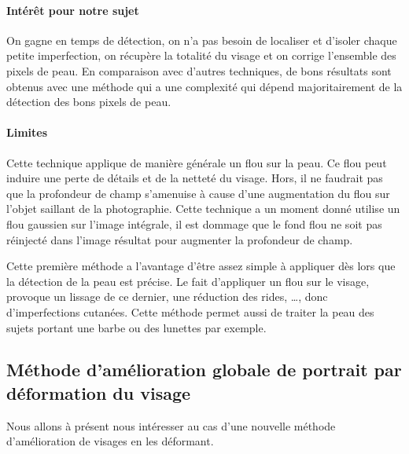 \documentclass[11pt, french,screen]{report-rd-info}
\begin{document}
\paragraph{Intérêt pour notre sujet}
On gagne en temps de détection, on n’a pas besoin de localiser et d’isoler chaque petite imperfection, on récupère la totalité du visage et on corrige l’ensemble des pixels de peau. En comparaison avec d’autres techniques, de bons résultats sont obtenus avec une méthode qui a une complexité qui dépend majoritairement de la détection des bons pixels de peau.
\paragraph{Limites}
Cette technique applique de manière générale un flou sur la peau. Ce flou peut induire une perte de détails et de la netteté du visage. Hors, il ne faudrait pas que la profondeur de champ s’amenuise à cause d’une augmentation du flou sur l'objet saillant de la photographie. Cette technique a un moment donné utilise un flou gaussien sur l’image intégrale, il est dommage que le fond flou ne soit pas réinjecté dans l’image résultat pour augmenter la profondeur de champ.

Cette première méthode a l’avantage d’être assez simple à appliquer dès lors que la détection de la peau est précise. Le fait d’appliquer un flou sur le visage, provoque un lissage de ce dernier, une réduction des rides, \ldots , donc d’imperfections cutanées. Cette méthode permet aussi de traiter la peau des sujets portant une barbe ou des lunettes par exemple.
\subsection{Méthode d’amélioration globale de portrait par déformation du visage}
Nous allons à présent nous intéresser au cas d’une nouvelle méthode d’amélioration de visages en les déformant.
\end{document}
